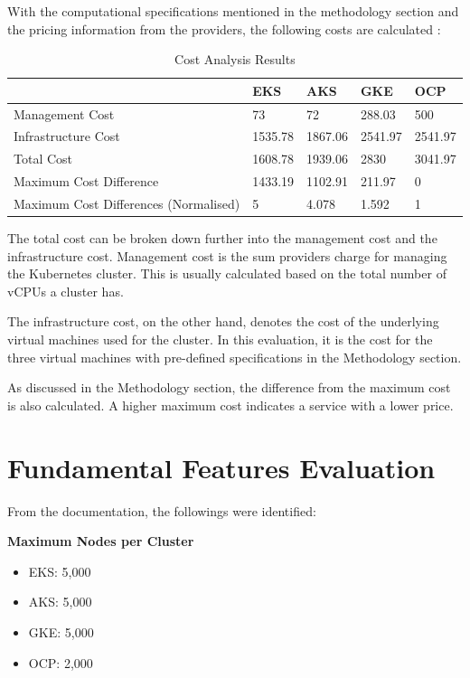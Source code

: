 With the computational specifications mentioned in the methodology section and the pricing information from the providers, the following costs are calculated \cite{CreateEstimateConfigure,PricingAzureKubernetes,GoogleCloudPricing,RedHatOpenShiftd}:
\begin{table}[!ht]
    \centering
    \begin{tabular}{|p{4cm}|p{2cm}|p{2cm}|p{2cm}|p{2cm}|} %
    \hline
         & EKS & AKS & GKE & OCP \\ \hline
        Management Cost & 73 & 72 & 288.03 & 500 \\ \hline
        Infrastructure Cost & 1535.78 & 1867.06 & 2541.97 & 2541.97 \\ \hline
        Total Cost & 1608.78 & 1939.06 & 2830 & 3041.97 \\ \hline
        Maximum Cost Difference & 1433.19 & 1102.91 & 211.97 & 0 \\ \hline
        Maximum Cost Differences (Normalised) & 5 & 4.078 & 1.592 & 1 \\ \hline
    \end{tabular}
    \caption{Cost Analysis Results} 
    \label{tab:cost-analysis}
\end{table}


\FloatBarrier

The total cost can be broken down further into the management cost and the infrastructure cost. Management cost is the sum providers charge for managing the Kubernetes cluster. This is usually calculated based on the total number of vCPUs a cluster has.

The infrastructure cost, on the other hand, denotes the cost of the underlying virtual machines used for the cluster. In this evaluation, it is the cost for the three virtual machines with pre-defined specifications in the Methodology section.

As discussed in the Methodology section, the difference from the maximum cost is also calculated. A higher maximum cost indicates a service with a lower price.

\section{Fundamental Features Evaluation}

From the documentation, the followings were identified:

\textbf{Maximum Nodes per Cluster}

\begin{itemize}
\tightlist
\item
  EKS: 5,000 \cite{KnownLimitsService}
\item
  AKS: 5,000  \cite{nickomangLimitsResourcesSKUs2024}
\item
  GKE: 5,000 \cite{QuotasLimitsGoogle}
\item
  OCP: 2,000  \cite{Chapter4Planning}
\end{itemize}



